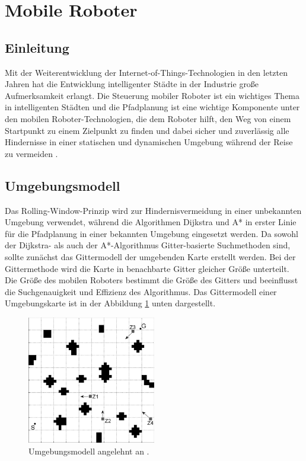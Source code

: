 \section{Mobile Roboter}
\label{Mobile Roboter}
\subsection{Einleitung}
Mit der Weiterentwicklung der Internet-of-Things-Technologien in den letzten Jahren hat die Entwicklung intelligenter Städte in der Industrie große Aufmerksamkeit erlangt.
Die Steuerung mobiler Roboter ist ein wichtiges Thema in intelligenten Städten und die Pfadplanung ist eine wichtige Komponente unter den mobilen Roboter-Technologien, die dem Roboter hilft, den Weg von einem Startpunkt zu einem Zielpunkt zu finden und dabei sicher und zuverlässig alle Hindernisse in einer statischen und dynamischen Umgebung während der Reise zu vermeiden \cite{Myung21,Hong-mei17}.

\subsection{Umgebungsmodell }
Das Rolling-Window-Prinzip wird zur Hindernisvermeidung in einer unbekannten Umgebung verwendet, während die Algorithmen Dijkstra und A* in erster Linie für die Pfadplanung in einer bekannten Umgebung eingesetzt werden.
\newline
Da sowohl der Dijkstra- als auch der A*-Algorithmus Gitter-basierte Suchmethoden sind, sollte zunächst das Gittermodell der umgebenden Karte erstellt werden. Bei der Gittermethode wird die Karte in benachbarte Gitter gleicher Größe unterteilt. 
Die Größe des mobilen Roboters bestimmt die Größe des Gitters und beeinflusst die Suchgenauigkeit und Effizienz des Algorithmus\cite{Hong-mei17}.
\newline
Das Gittermodell einer Umgebungskarte ist in der Abbildung \ref{fig:Umgebungsmodell-Grid} unten dargestellt.

\begin{figure}[H]
	\centering
	\includegraphics[width=0.5\textwidth]{images/Grid_Modell.PNG}
	\caption{Umgebungsmodell angelehnt an \cite{Hong-mei17}.}
	\label{fig:Umgebungsmodell-Grid}
\end{figure}

